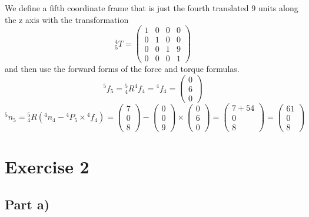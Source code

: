 \documentclass[10pt,a4paper]{article}
\begin{document}
We define a fifth coordinate frame that is just the fourth translated 9 units along the z axis with the transformation
\begin{equation*}
  {}_{5}^{4}T = \begin{pmatrix}
    1 & 0 & 0 & 0\\
    0 & 1 & 0 & 0\\
    0 & 0 & 1 & 9\\
    0 & 0 & 0 & 1
  \end{pmatrix}
\end{equation*}
and then use the forward forms of the force and torque formulas.
\begin{equation*}
  {}^{5}f_{5} = {}_{4}^{5}R{}^{4}f_{4} = {}^{4}f_{4} = \begin{pmatrix}
    0\\6\\0
  \end{pmatrix}
\end{equation*}
\begin{equation*}
  {}^{5}n_{5} = {}_{4}^{5}R({}^{4}n_{4} - {}^{4}P_{5} \times {}^{4}f_{4}) = \begin{pmatrix}
    7\\0\\8
  \end{pmatrix} - \begin{pmatrix}
    0\\0\\9
  \end{pmatrix} \times \begin{pmatrix}
    0\\6\\0
  \end{pmatrix} = \begin{pmatrix}
    7 + 54\\
    0\\
    8
  \end{pmatrix} = \begin{pmatrix}
    61\\0\\8
  \end{pmatrix}
\end{equation*}

\section*{Exercise 2}

\subsection*{Part a)}
\end{document}
